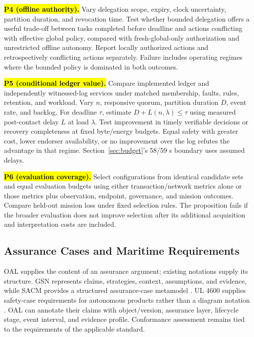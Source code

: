 \documentclass[blockchains,review,accept,moreauthors]{Definitions/mdpi}
\begin{document}
\textbf{\hl{P4 (offline authority).}} Vary delegation scope, expiry, clock uncertainty, partition duration, and revocation time. Test whether bounded delegation offers a useful trade-off between tasks completed before deadline and actions conflicting with effective global policy, compared with fresh-global-only authorization and unrestricted offline autonomy. Report locally authorized actions and retrospectively conflicting actions separately. Failure includes operating regimes where the bounded policy is dominated in both outcomes.

\textbf{\hl{P5 (conditional ledger value).}} Compare implemented ledger and independently witnessed-log services under matched membership, faults, rules, retention, and workload. Vary $n$, responsive quorum, partition duration $D$, event rate, and backlog. For deadline $\tau$, estimate $D+L(n,\lambda)\leq\tau$ using measured post-contact delay $L$ at load $\lambda$. Test improvement in timely verifiable decisions or recovery completeness at fixed byte/energy budgets. Equal safety with greater cost, lower endorser availability, or no improvement over the log refutes the advantage in that regime. Section~\ref{sec:budget}'s 58/59 s boundary uses assumed delays.

\textbf{\hl{P6 (evaluation coverage).}} Select configurations from identical candidate sets and equal evaluation budgets using either transaction/network metrics alone or those metrics plus observation, endpoint, governance, and mission outcomes. Compare held-out mission loss under fixed selection rules. The proposition fails if the broader evaluation does not improve selection after its additional acquisition and interpretation costs are included.

\subsection{Assurance Cases and Maritime Requirements}\label{sec:assurance-case}

OAL supplies the content of an assurance argument; existing notations supply its structure. GSN represents claims, strategies, context, assumptions, and evidence, while SACM provides a structured assurance-case metamodel \citep{gsn2021,sacm2023}. UL 4600 supplies safety-case requirements for autonomous products rather than a diagram notation \citep{ul4600}. OAL can annotate their claims with object/version, assurance layer, lifecycle stage, event interval, and evidence profile. Conformance assessment remains tied to the requirements of the applicable standard.
\end{document}
